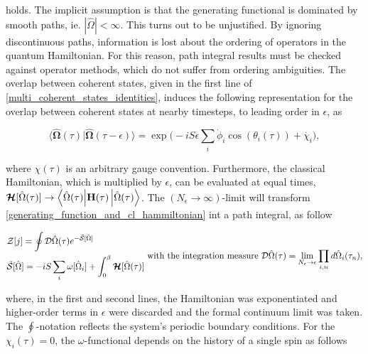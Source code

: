 holds. The implicit assumption is that the generating functional is dominated by smooth paths, ie. $|\hat{{\Omega}}| < \infty$. This turns out to be unjustified. By ignoring discontinuous paths, information is lost about the ordering of operators in the quantum Hamiltonian. For this reason, path integral results must be checked against operator methods, which do not suffer from ordering ambiguities. The overlap between coherent states, given in the first line of \cref{multi_coherent_states_identities}, induces the following representation for the overlap between coherent states at nearby timesteps, to leading order in $\epsilon$, as 

\begin{equation}
    \bigg\langle \hat{\bm{\Omega}}(\tau) \bigg| \hat{\bm{\Omega}}(\tau - \epsilon) \bigg\rangle = \exp \bigg(-i S \epsilon \sum_{i} \dot{\phi}_i \cos (\theta_i(\tau)) + \dot{\chi_i}\bigg),
\end{equation}

where $\chi(\tau)$ is an arbitrary gauge convention. Furthermore, the classical Hamiltonian, which is multiplied by $\epsilon$, can be evaluated at equal times, $\bm{\mathcal{H}}[\hat{\Omega}(\tau)] \rightarrow {\bra{\hat{\Omega}(\tau)}} {{\bf H}} (\tau) \ket{\hat{\Omega}(\tau)}$. The $(N_{\epsilon} \rightarrow \infty)$-limit will transform \cref{generating_function_and_cl_hammiltonian} int a path integral, as follow

\begin{equation}
    \begin{split}
        &\mathcal{Z}[j] = \oint \mathcal{D} \hat{\Omega}(\tau) e^{- \tilde{\mathcal{S}}[\hat{\Omega}]} \\
        & \tilde{\mathcal{S}}[\hat{\Omega}] = -iS \sum_{i} \omega[\hat{\Omega}_i] + \int_{0}^{\beta} \bm{\mathcal{H}}[\hat{\Omega}(\tau)]
    \end{split} \textnormal{ with the integration measure } \mathcal{D} \hat{\Omega}(\tau) = \lim_{N_{\epsilon}\rightarrow \epsilon} \prod_{i,n}  d \hat{\Omega}_i(\tau_n),
    \label{spin_wave_theoretic_wave_generating_func_and_phase_func}
\end{equation}

where, in the first and second lines, the Hamiltonian was exponentiated and higher-order terms in $\epsilon$ were discarded and the formal continuum limit was taken. The $\oint$-notation reflects the system's periodic boundary conditions. For the $\chi_i(\tau) = 0$, the $\omega$-functional depends on the history of a single spin as follows

